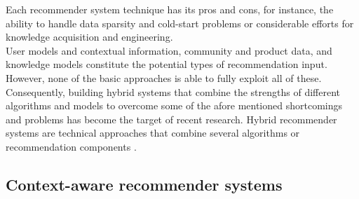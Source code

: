 Each recommender system technique has its pros and cons, for
instance, the ability to handle data sparsity and cold-start problems
or considerable efforts for knowledge acquisition and engineering. \\
User models and contextual information, community and product data,
and knowledge models constitute the potential types of recommendation
input. However, none of the basic approaches is able to fully exploit
all of these. Consequently, building hybrid systems that combine the
strengths of different algorithms and models to overcome some of the
afore mentioned shortcomings and problems has become the target of
recent research. Hybrid recommender systems are technical approaches
that combine several algorithms or recommendation components
\cite{jannach2010recommender}.

\subsection{Context-aware recommender systems}

